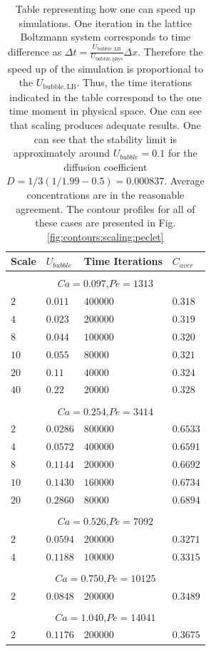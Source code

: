 \documentclass{article}
\begin{document}
\begin{table}[htb!]
\begin{tabularx}{\textwidth}{|X|X|X|X|}
\hline
Scale&$U_{bubble}$&Time Iterations&$C_{aver}$\\
\hline
\multicolumn{4}{c}{}\\
\multicolumn{4}{c}{$Ca=0.097$,$Pe=1313$}\\
\hline
$2$ &$0.011$&$400000$&$0.318$\\
$4$ &$0.023$&$200000$&$0.319$\\
$8$ &$0.044$&$100000$&$0.320$\\
$10$&$0.055$&$80000$ &$0.321$\\
$20$&$0.11 $&$40000$ &$0.324$\\
$40$&$0.22 $&$20000$ &$0.328$\\
\hline
\multicolumn{4}{c}{}\\
\multicolumn{4}{c}{$Ca=0.254$,$Pe=3414$}\\
\hline
$2$& $0.0286$&$800000$&$0.6533$\\
$4$& $0.0572$&$400000$&$0.6591$\\
$8$& $0.1144$&$200000$&$0.6692$\\
$10$&$0.1430$&$160000$&$0.6734$\\
$20$&$0.2860$&$80000$ &$0.6894$\\
\hline
\multicolumn{4}{c}{}\\
\multicolumn{4}{c}{$Ca=0.526$,$Pe=7092$}\\
\hline
$2$&$0.0594$&$200000$&$0.3271$\\
$4$&$0.1188$&$100000$&$0.3315$\\
\hline
\multicolumn{4}{c}{}\\
\multicolumn{4}{c}{$Ca=0.750$,$Pe=10125$}\\
\hline
$2$&$0.0848$&$200000$&$0.3489$\\
\hline
\multicolumn{4}{c}{}\\
\multicolumn{4}{c}{$Ca=1.040$,$Pe=14041$}\\
\hline
$2$&$0.1176$&$200000$&$0.3675$\\
\hline
\end{tabularx}
\caption{Table representing how one can speed up simulations. One iteration in the lattice
Boltzmann system corresponds to time difference as
$\Delta t=\frac{U_{\mathrm{bubble,LB}}}{U_{\mathrm{bubble,phys}}} \Delta x$. Therefore the speed up
of the simulation is proportional to the  $U_{\mathrm{bubble,LB}}$. Thus, the time iterations
indicated in the table correspond to the one time moment in physical space. One can see that
scaling produces adequate results.  One can see that the stability limit is approximately around
$U_{bubble}=0.1$ for the diffusion coefficient
$D=1/3(1/1.99-0.5)=0.000837$. Average concentrations are in the reasonable agreement. The contour
profiles for all of these cases are presented in Fig. \ref{fig:contours:scaling:peclet}
\label{table:scaling:peclet}}
\end{table}
\end{document}
